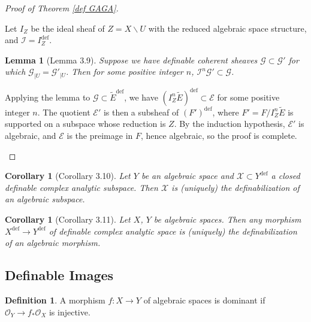 \documentclass{amsart}
\newtheorem{lemma}[theorem]{Lemma}
\newtheorem{corollary}[theorem]{Corollary}
\theoremstyle{definition}
\newtheorem{definition}[theorem]{Definition}
\numberwithin{equation}{section}
\newcommand{\definable}{\mathrm{def}}
\begin{document}
\begin{proof}[Proof of Theorem \ref{def GAGA}]
\begin{enumerate}[label = {Step \arabic*.}]
        Let $I_Z$ be the ideal sheaf of $Z = X \backslash U$ with the reduced algebraic space structure, and $\mathcal{I} = I_Z^{\definable}$.
        \begin{lemma}[Lemma 3.9]
            Suppose we have definable coherent sheaves $\mathcal{G} \subset \mathcal{G}'$
            for which $\mathcal{G}_{|U} = \mathcal{G}'_{|U}$.
            Then for some positive integer $n$, $\mathcal{I}^n\mathcal{G}' \subset \mathcal{G}$.
        \end{lemma}
        Applying the lemma to $\mathcal{G} \subset \widetilde{E}^{\definable}$,
        we have $(I^n_Z\widetilde{E})^{\definable} \subset \mathcal{E}$ for some positive integer $n$.
        The quotient $\mathcal{E}'$ is then a subsheaf of $(F')^{\definable}$, where $F' = F/I^n_Z\widetilde{E}$ is supported on a subspace whose reduction is $Z$.
        By the induction hypothesis, $\mathcal{E}'$ is algebraic,
        and $\mathcal{E}$ is the preimage in $F$,
        hence algebraic, so the proof is complete.
    \end{enumerate}
\end{proof}

\begin{corollary}[Corollary 3.10]
    Let $Y$ be an algebraic space and $\mathcal{X} \subset Y^{\definable}$ a closed definable complex analytic subspace.
    Then $\mathcal{X}$ is (uniquely) the definabilization of an algebraic subspace.
\end{corollary}

\begin{corollary}[Corollary 3.11]
    Let $X$, $Y$ be algebraic spaces.
    Then any morphism $X^{\definable} \to Y^{\definable}$ of definable complex analytic space is (uniquely) the definabilization of an algebraic morphism.
\end{corollary}

\subsection{Definable Images}

\begin{definition}
    A morphism $f:X \to Y$ of algebraic spaces is dominant if $\mathcal{O}_Y \to f_*\mathcal{O}_X$ is injective.
\end{definition}
\end{document}
